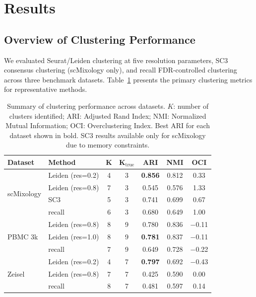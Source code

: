 
\section{Results}
\label{sec:results}

\subsection{Overview of Clustering Performance}

We evaluated Seurat/Leiden clustering at five resolution parameters, SC3 consensus clustering (scMixology only), and recall FDR-controlled clustering across three benchmark datasets. Table~\ref{tab:metrics_summary} presents the primary clustering metrics for representative methods.

\begin{table}[htbp]
\centering
\caption{Summary of clustering performance across datasets. $K$: number of clusters identified; ARI: Adjusted Rand Index; NMI: Normalized Mutual Information; OCI: Overclustering Index. Best ARI for each dataset shown in bold. SC3 results available only for scMixology due to memory constraints.}
\label{tab:metrics_summary}
\begin{tabular}{@{}llccccc@{}}
\toprule
\textbf{Dataset} & \textbf{Method} & \textbf{K} & \textbf{K$_{\text{true}}$} & \textbf{ARI} & \textbf{NMI} & \textbf{OCI} \\
\midrule
\multirow{4}{*}{scMixology}
    & Leiden (res=0.2) & 4 & 3 & \textbf{0.856} & 0.812 & 0.33 \\
    & Leiden (res=0.8) & 7 & 3 & 0.545 & 0.576 & 1.33 \\
    & SC3 & 5 & 3 & 0.741 & 0.699 & 0.67 \\
    & recall & 6 & 3 & 0.680 & 0.649 & 1.00 \\
\midrule
\multirow{3}{*}{PBMC 3k}
    & Leiden (res=0.8) & 8 & 9 & 0.780 & 0.836 & $-$0.11 \\
    & Leiden (res=1.0) & 8 & 9 & \textbf{0.781} & 0.837 & $-$0.11 \\
    & recall & 7 & 9 & 0.649 & 0.728 & $-$0.22 \\
\midrule
\multirow{3}{*}{Zeisel}
    & Leiden (res=0.2) & 4 & 7 & \textbf{0.797} & 0.692 & $-$0.43 \\
    & Leiden (res=0.8) & 7 & 7 & 0.425 & 0.590 & 0.00 \\
    & recall & 8 & 7 & 0.481 & 0.597 & 0.14 \\
\bottomrule
\end{tabular}
\end{table}

